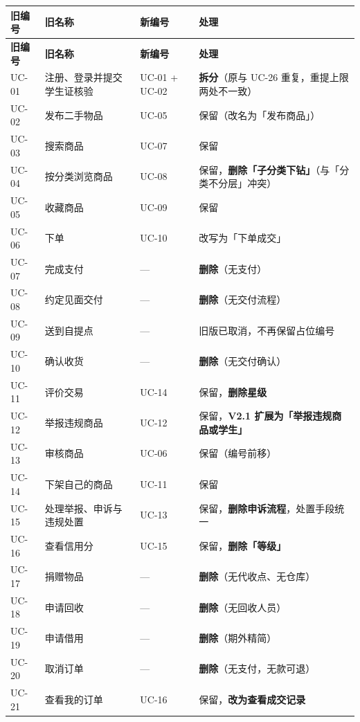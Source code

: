 \documentclass[12pt,a4paper]{ctexart}
\begin{document}
{\scriptsize
\begin{longtable}{|p{2.44cm}|p{4.03cm}|p{2.44cm}|p{7.09cm}|}
\hline
\textbf{旧编号} & \textbf{旧名称} & \textbf{新编号} & \textbf{处理} \\
\hline
\endfirsthead
\hline
\textbf{旧编号} & \textbf{旧名称} & \textbf{新编号} & \textbf{处理} \\
\hline
\endhead
\hline
\endfoot
UC-01 & 注册、登录并提交学生证核验 & UC-01 + UC-02 & \textbf{拆分}（原与 UC-26 重复，重提上限两处不一致） \\
\hline
UC-02 & 发布二手物品 & UC-05 & 保留（改名为「发布商品」） \\
\hline
UC-03 & 搜索商品 & UC-07 & 保留 \\
\hline
UC-04 & 按分类浏览商品 & UC-08 & 保留，\textbf{删除「子分类下钻」}（与「分类不分层」冲突） \\
\hline
UC-05 & 收藏商品 & UC-09 & 保留 \\
\hline
UC-06 & 下单 & UC-10 & 改写为「下单成交」 \\
\hline
UC-07 & 完成支付 & — & \textbf{删除}（无支付） \\
\hline
UC-08 & 约定见面交付 & — & \textbf{删除}（无交付流程） \\
\hline
UC-09 & 送到自提点 & — & 旧版已取消，不再保留占位编号 \\
\hline
UC-10 & 确认收货 & — & \textbf{删除}（无交付确认） \\
\hline
UC-11 & 评价交易 & UC-14 & 保留，\textbf{删除星级} \\
\hline
UC-12 & 举报违规商品 & UC-12 & 保留，\textbf{V2.1 扩展为「举报违规商品或学生」} \\
\hline
UC-13 & 审核商品 & UC-06 & 保留（编号前移） \\
\hline
UC-14 & 下架自己的商品 & UC-11 & 保留 \\
\hline
UC-15 & 处理举报、申诉与违规处置 & UC-13 & 保留，\textbf{删除申诉流程}，处置手段统一 \\
\hline
UC-16 & 查看信用分 & UC-15 & 保留，\textbf{删除「等级」} \\
\hline
UC-17 & 捐赠物品 & — & \textbf{删除}（无代收点、无仓库） \\
\hline
UC-18 & 申请回收 & — & \textbf{删除}（无回收人员） \\
\hline
UC-19 & 申请借用 & — & \textbf{删除}（期外精简） \\
\hline
UC-20 & 取消订单 & — & \textbf{删除}（无支付，无款可退） \\
\hline
UC-21 & 查看我的订单 & UC-16 & 保留，\textbf{改为查看成交记录} \\

\end{longtable}}
\end{document}
